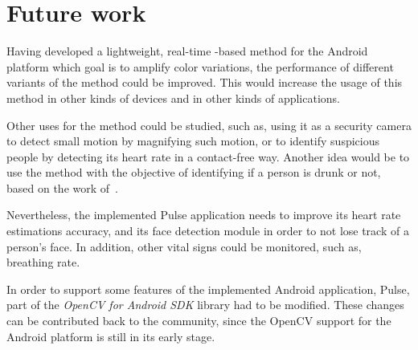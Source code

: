 \section{Future work} \label{sec:conclusions:future}

Having developed a lightweight, real-time \evm{}-based method for the
Android platform which goal is to amplify color variations, the performance
of different variants of the \evm{} method could be improved. This would
increase the usage of this method in other kinds of devices and in other
kinds of applications.

Other uses for the \evm{} method could be studied, such as, using it as a
security camera to detect small motion by magnifying such motion, or to identify
suspicious people by detecting its heart rate in a contact-free way. Another
idea would be to use the \evm{} method with the objective of identifying
if a person is drunk or not, based on the work of~\cite{Koukiou2012Drunk}.

Nevertheless, the implemented Pulse application needs to improve its heart rate
estimations accuracy, and its face detection module in order to not lose track
of a person's face. In addition, other vital signs could be monitored, such as,
breathing rate.

In order to support some features of the implemented Android application, Pulse,
part of the \emph{OpenCV for Android SDK} library had to be modified. These
changes can be contributed back to the community, since the OpenCV support
for the Android platform is still in its early stage.
